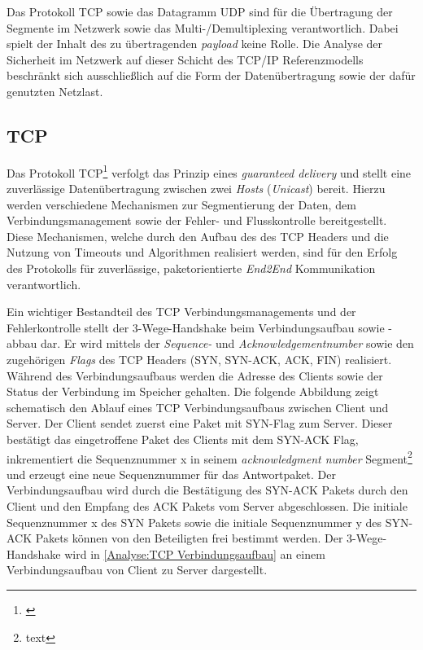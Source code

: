 Das Protokoll \ac{TCP} sowie das Datagramm \ac{UDP} sind für die Übertragung der Segmente im Netzwerk sowie das Multi-/Demultiplexing verantwortlich. Dabei spielt der Inhalt des zu übertragenden \textit{payload} keine Rolle. Die Analyse der Sicherheit im Netzwerk auf dieser Schicht des \ac{TCP}/\ac{IP} Referenzmodells beschränkt sich ausschließlich auf die Form der Datenübertragung sowie der dafür genutzten Netzlast.

\subsection{\ac{TCP}}
\label{Analyse:TCP}
Das Protokoll \ac{TCP}\footnote{\cite{TCP}} verfolgt das Prinzip eines \textit{guaranteed delivery} und stellt eine zuverlässige Datenübertragung zwischen zwei \textit{Hosts} (\textit{Unicast}) bereit. Hierzu werden verschiedene Mechanismen zur Segmentierung der Daten, dem Verbindungsmanagement sowie der Fehler- und Flusskontrolle bereitgestellt. Diese Mechanismen, welche durch den Aufbau des des \ac{TCP} Headers und die Nutzung von Timeouts und Algorithmen realisiert werden, sind für den Erfolg des Protokolls für zuverlässige, paketorientierte \textit{End2End} Kommunikation verantwortlich.

Ein wichtiger Bestandteil des \ac{TCP} Verbindungsmanagements und der Fehlerkontrolle stellt der 3-Wege-Handshake beim Verbindungsaufbau sowie -abbau dar. Er wird mittels der \textit{Sequence-} und \textit{Acknowledgementnumber} sowie den zugehörigen \textit{Flags} des \ac{TCP} Headers (\ac{SYN}, \ac{SYN-ACK}, \ac{ACK}, \ac{FIN}) realisiert. Während des Verbindungsaufbaus werden die Adresse des Clients sowie der Status der Verbindung im Speicher gehalten. Die folgende Abbildung zeigt schematisch den Ablauf eines \ac{TCP} Verbindungsaufbaus zwischen Client und Server. Der Client sendet zuerst eine Paket mit SYN-Flag zum Server. Dieser bestätigt das eingetroffene Paket des Clients mit dem SYN-ACK Flag, inkrementiert die Sequenznummer x in seinem \textit{acknowledgment number} Segment\footnote{text} und erzeugt eine neue Sequenznummer für das Antwortpaket. Der Verbindungsaufbau wird durch die Bestätigung des SYN-ACK Pakets durch den Client und den Empfang des ACK Pakets vom Server abgeschlossen. Die initiale Sequenznummer x des SYN Pakets sowie die initiale Sequenznummer y des SYN-ACK Pakets können von den Beteiligten frei bestimmt werden. Der 3-Wege-Handshake wird in \autoref{Analyse:TCP Verbindungsaufbau} an einem Verbindungsaufbau von Client zu Server dargestellt.


